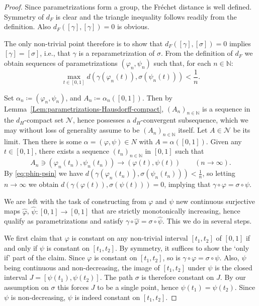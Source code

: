 \documentclass[10pt,a4paper]{amsart}
\newcommand{\N}{\mathbb N}
\begin{document}
\begin{proof} Since parametrizations form a group, the Fr\'echet distance is well defined. Symmetry of $d_F$ is clear and the triangle inequality follows readily from the definition. Also $d_F([\gamma],[\gamma])=0$ is obvious. 

The only non-trivial point therefore is to show that $d_F([\gamma],[\sigma])=0$ implies $[\gamma]=[\sigma]$, i.e., that $\gamma$ is a reparametrization of $\sigma$. From the definition of $d_F$ we obtain sequences of parametrizations $(\varphi_n,\psi_n)$ such that, for each $n\in\N$:
\begin{equation}\label{eq:phin-psin}
    \max_{t\in [0,1]} d(\gamma(\varphi_n(t)),\sigma(\psi_n(t))) < \frac{1}{n}.
\end{equation}

Set $\alpha_n \coloneqq (\varphi_n,\psi_n)$, and $A_n \coloneqq \alpha_n([0,1])$. Then by Lemma~\ref{Lem:parametrizations-Hausdorff-compact}, $(A_n)_{n\in \N}$
is a sequence in the $d_H$-compact set $\mathcal{N}$, hence possesses a $d_H$-convergent subsequence, which we may without loss of generality assume to be $(A_n)_{n\in \N}$ itself. Let $A\in \mathcal{N}$ be its limit. Then there is some $\alpha = (\varphi,\psi)\in N$ with $A=\alpha([0,1])$. Given any $t\in [0,1]$, there exists a sequence $(t_n)_{n\in \N}$ in $[0,1]$ such that 
\[
A_n\ni (\varphi_n(t_n),\psi_n(t_n)) \to (\varphi(t),\psi(t)) \qquad (n\to \infty).
\]
By \eqref{eq:phin-psin} we have $d(\gamma(\varphi_n(t_n)),\sigma(\psi_n(t_n))) < \frac{1}{n}$, so letting $n\to \infty$ we obtain
$d(\gamma(\varphi(t)),\sigma(\psi(t)))=0$, implying that $\gamma\circ \varphi = \sigma\circ \psi$. 

We are left with the task of constructing from $\varphi$ and $\psi$ new continuous surjective maps $\hat\varphi$, $\hat\psi \colon [0,1]\to [0,1]$ that are strictly monotonically increasing, hence qualify as parametrizations and satisfy $\gamma\circ \hat\varphi = \sigma\circ \hat\psi$. This we do
in several steps.

We first claim that $\varphi$ is constant on any non-trivial interval $[t_1,t_2]$ of $[0,1]$ if and only if $\psi$ is constant on $[t_1,t_2]$.
By symmetry, it suffices to show the `only if' part of the claim. Since $\varphi$ is constant on $[t_1,t_2]$, so is
$\gamma\circ \varphi = \sigma\circ \psi$.
Also, $\psi$ being continuous and non-decreasing, the image of $[t_1, t_2]$ under $\psi$ is the closed interval $J = [\psi(t_1), \psi(t_2)]$.
The path $\sigma$ is therefore constant on $J$. By our assumption on $\sigma$ this forces $J$ to be a single point, hence
$\psi(t_1) = \psi(t_2)$. Since $\psi$ is non-decreasing, $\psi$ is indeed constant on $[t_1, t_2]$.


\end{proof}
\end{document}
